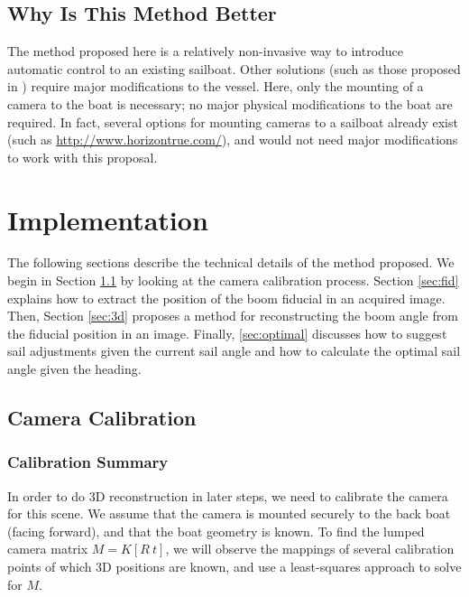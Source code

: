 \documentclass[letterpaper, 10 pt, conference]{ieeeconf}  %
\begin{document}
\subsection{Why Is This Method Better}
The method proposed here is a relatively non-invasive way to introduce automatic control to an existing sailboat. Other solutions (such as those proposed in \cite{Stelzer:2011}) require major modifications to the vessel. Here, only the mounting of a camera to the boat is necessary; no major physical modifications to the boat are required. In fact, several options for mounting cameras to a sailboat already exist (such as  \url{http://www.horizontrue.com/}), and would not need major modifications to work with this proposal.  

\section{Implementation}
The following sections describe the technical details of the method proposed. We begin in Section \ref{sec:calibration} by looking at the camera calibration process. Section \ref{sec:fid} explains how to extract the position of the boom fiducial in an acquired image. Then, Section \ref{sec:3d} proposes a method for reconstructing the boom angle from the fiducial position in an image. Finally, \ref{sec:optimal} discusses how to suggest sail adjustments given the current sail angle and how to calculate the optimal sail angle given the heading.
%
%
\subsection{Camera Calibration}
\label{sec:calibration}
\subsubsection{Calibration Summary}
In order to do 3D reconstruction in later steps, we need to calibrate the camera for this scene. We assume that the camera is mounted securely to the back boat (facing forward), and that the boat geometry is known. To find the lumped camera matrix $M = K[R~t]$, we will observe the mappings of several calibration points of which 3D positions are known, and use a least-squares approach to solve for $M$. 
\end{document}
